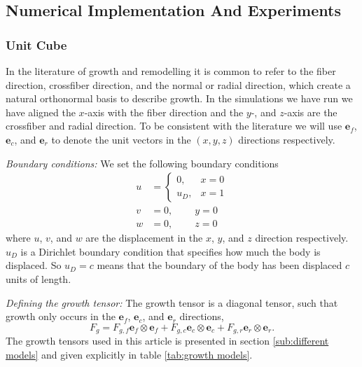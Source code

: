 \subsection{Numerical Implementation And Experiments}
\subsubsection{Unit Cube}
\label{subsec: experiments}
In the literature of growth and remodelling it is common to refer to the fiber direction, crossfiber direction, and the normal or radial direction, which create a natural orthonormal basis to describe growth. In the simulations we have run we have aligned the $x$-axis with the fiber direction and the $y$-, and $z$-axis are the crossfiber and radial direction. To be consistent with the literature we will use $\mathbf{e}_f$, $\mathbf{e}_c$, and $\mathbf{e}_r$ to denote the unit vectors in the $(x, y, z)$ directions respectively.  \par
\emph{Boundary conditions:} We set the following boundary conditions
\begin{align*}
    u &= \begin{cases}
        0, & x = 0 \\
        u_D, & x = 1
    \end{cases} \\
    v &= 0, \qquad \ y = 0 \\
    w &= 0, \qquad \ z = 0
\end{align*}
where $u$, $v$, and $w$ are the displacement in the $x$, $y$, and $z$ direction respectively. $u_D$ is a Dirichlet boundary condition that specifies how much the body is displaced. So $u_D = c$ means that the boundary of the body has been displaced $c$ units of length.
\par
\emph{Defining the growth tensor:} The growth tensor is a diagonal tensor, such that growth only occurs in the $\mathbf{e}_f$, $\mathbf{e}_c$, and $\mathbf{e}_r$ directions, 
\begin{equation*}
    F_g = F_{g,f}\mathbf{e}_f\otimes \mathbf{e}_f + F_{g,c}\mathbf{e}_c\otimes \mathbf{e}_c + F_{g,r}\mathbf{e}_r\otimes \mathbf{e}_r.
\end{equation*}
The growth tensors used in this article is presented in section \ref{sub:different models} and given explicitly in table \ref{tab:growth models}.\par
